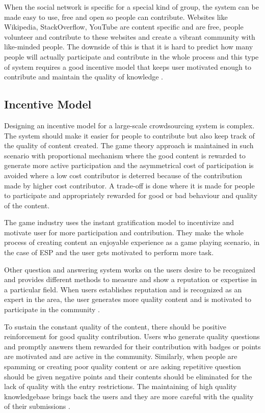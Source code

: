 When the social network is specific for a special kind of group, the system can be made easy to use, free and open so people can contribute. Websites like Wikipedia, StackOverflow, YouTube are content specific and are free, people volunteer and contribute to these websites and create a vibrant community with like-minded people. The downside of this is that it is hard to predict how many people will actually participate and contribute in the whole process and this type of system requires a good incentive model that keeps user motivated enough to contribute and maintain the quality of knowledge \cite{doan2011crowdsourcing}.

\subsection{Incentive Model}

Designing an incentive model for a large-scale crowdsourcing system is complex. The system should make it easier for people to contribute but also keep track of the quality of content created. The game theory approach is maintained in such scenario with proportional mechanism where the good content is rewarded to generate more active participation and the asymmetrical cost of participation is avoided where a low cost contributor is deterred because of the contribution made by higher cost contributor. A trade-off is done where it is made for people to participate and appropriately rewarded for good or bad behaviour and quality of the content.

The game industry uses the instant gratification model to incentivize and motivate user for more participation and contribution. They make the whole process of creating content an enjoyable experience as a game playing scenario, in the case of ESP \cite{vonAhn2004} and the user gets motivated to perform more task.

Other question and answering system works on the users desire to be recognized and provides different methods to measure and show a reputation or expertise in a particular field. When users establishes reputation and is recognized as an expert in the area, the user generates more quality content and is motivated to participate in the community \cite{richardson2003building}.

To sustain the constant quality of the content, there should be positive reinforcement for good quality contribution. Users who generate quality questions and promptly answers them rewarded for their contribution with badges or points are motivated and are active in the community. Similarly, when people are spamming or creating poor quality content or are asking repetitive question should be given negative points and their contents should be eliminated for the lack of quality with the entry restrictions. The maintaining of high quality knowledgebase brings back the users and they are more careful with the quality of their submissions \cite{ghosh2011incentivizing}.

